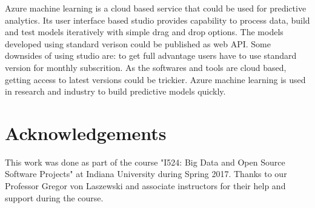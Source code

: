 \documentclass[9pt,twocolumn,twoside]{../../styles/osajnl}
\begin{document}
Azure machine learning is a cloud based service that could be used for
predictive analytics. Its user interface based studio provides
capability to process data, build and test models iteratively with
simple drag and drop options. The models developed using standard
verison could be published as web API. Some downsides of using studio
are: to get full advantage users have to use standard version for
monthly subscrition. As the softwares and tools are cloud based,
getting access to latest versions could be trickier. Azure machine
learning is used in research and industry to build predictive models
quickly.


\section*{Acknowledgements}

This work was done as part of the course "I524: Big Data and Open
Source Software Projects" at Indiana University during Spring
2017. Thanks to our Professor Gregor von Laszewski and associate
instructors for their help and support during the course. 


\end{document}

